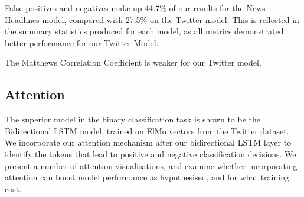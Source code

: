 \documentclass[12pt,a4paper]{article}
\begin{document}
\noindent False positives and negatives make up 44.7\% of our results for the News Headlines model, compared with 27.5\% on the Twitter model. This is reflected in the summary statistics produced for each model, as all metrics demonstrated better performance for our Twitter Model. 

The Matthews Correlation Coefficient is weaker for our Twitter model,

\subsection{Attention}\vspace{-5pt}
\noindent The superior model in the binary classification task is shown to be the Bidirectional LSTM model, trained on ElMo vectors from the Twitter dataset. We incorporate our attention mechanism after our bidirectional LSTM layer to identify the tokens that lead to positive and negative classification decisions. We present a number of attention visualisations, and examine whether incorporating attention can boost model performance as hypothesised, and for what training cost.\\\vspace{-5pt}
\end{document}
